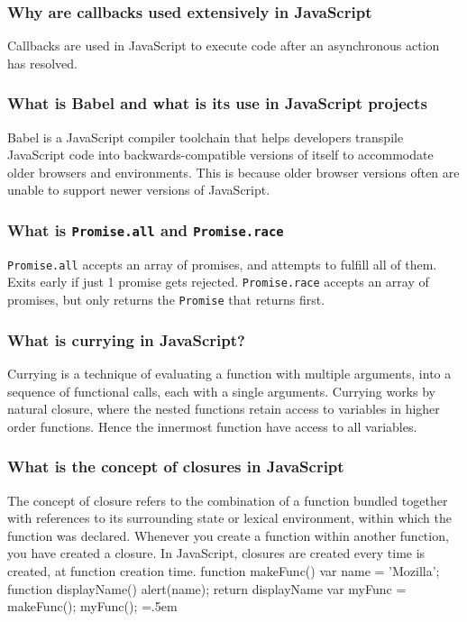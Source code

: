 \documentclass[12pt, a4paper]{article}
\newcommand{\code}[1]{\texttt{#1}}
\newenvironment{lcverbatim}
 {\SaveVerbatim{cverb}}
 {\endSaveVerbatim
  \flushleft\fboxrule=0pt\fboxsep=.5em
  \colorbox{test}{%
    \makebox[\dimexpr\linewidth-2\fboxsep][l]{\BUseVerbatim{cverb}}%
  }
  \endflushleft
}
\begin{document}
\subsubsection*{Why are callbacks used extensively in JavaScript}
Callbacks are used in JavaScript to execute code after an asynchronous action has resolved.

\subsubsection*{What is Babel and what is its use in JavaScript projects}
Babel is a JavaScript compiler toolchain that helps developers transpile JavaScript code into backwards-compatible versions of itself to accommodate older browsers and environments.
This is because older browser versions often are unable to support newer versions of JavaScript.

\subsubsection*{What is \code{Promise.all} and \code{Promise.race}}
\code{Promise.all} accepts an array of promises, and attempts to fulfill all of them.
Exits early if just 1 promise gets rejected.\newline
\code{Promise.race} accepts an array of promises, but only returns the \code{Promise} that returns first.

\subsubsection*{What is currying in JavaScript?}
Currying is a technique of evaluating a function with multiple arguments, into a sequence of functional calls, each with a single arguments.\newline
Currying works by natural closure, where the nested functions retain access to variables in higher order functions.
Hence the innermost function have access to all variables.

\subsubsection*{What is the concept of closures in JavaScript}
The concept of closure refers to the combination of a function bundled together with references to its surrounding state or lexical environment, within which the function was declared.
Whenever you create a function within another function, you have created a closure.
In JavaScript, closures are created every time is created, at function creation time.
\begin{lcverbatim}
function makeFunc() {
    var name = 'Mozilla';
    function displayName() {
            alert(name);
        }
    return displayName
}
var myFunc = makeFunc();
myFunc();
\end{lcverbatim}
\end{document}
